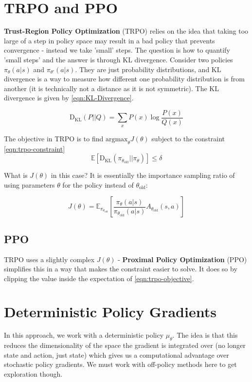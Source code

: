 \documentclass[11pt]{report}
\begin{document}
\section{TRPO and PPO}
\textbf{Trust-Region Policy Optimization} (TRPO) relies on the idea that taking too large of a step in policy space may result in a bad policy that prevents convergence - instead we take 'small' steps. The question is how to quantify 'small steps' and the answer is through KL divergence. Consider two policies $\pi_\theta(a | s)$ and $\pi_{\theta'}(a | s)$. They are just probability distributions, and KL divergence is a way to measure how different one probability distribution is from another (it is technically not a distance as it is not symmetric). The KL divergence is given by \autoref{eqn:KL-Divergence}.

\begin{equation}
	\label{eqn:KL-Divergence}
	\text{D}_{\text{KL}}(P|| Q) = \sum_{x} P(x) \log\frac{P(x)}{Q(x)}
\end{equation}

The objective in TRPO is to find $\text{argmax}_{\theta}J(\theta)$ subject to the constraint \autoref{eqn:trpo-constraint}
\begin{equation}
	\label{eqn:trpo-constraint}
	\mathbb{E}\left[ \text{D}_{\text{KL}}(\pi_{\theta_{\text{old}}} || \pi_{\theta}) \right] \le \delta
\end{equation}

What is $J(\theta)$ in this case? It is essentially the importance sampling ratio of using parameters $\theta$ for the policy instead of $\theta_{\text{old}}$:

\begin{equation}
	\label{eqn:trpo-objective}
	J(\theta) = \mathbb{E}_{\pi_{\theta_\text{old}}}\left[  \frac{\pi_{\theta}(a|s)}{\pi_{\theta_\text{old}}(a|s)} A_{\theta_{\text{old}}}(s, a) \right]
\end{equation}


\subsection{PPO}
TRPO uses a slightly complex $J(\theta)$ - \textbf{Proximal Policy Optimization} (PPO) simplifies this in a way that makes the constraint easier to solve. It does so by clipping the value inside the expectation of \autoref{eqn:trpo-objective}.


\section{Deterministic Policy Gradients}
In this approach, we work with a deterministic policy $\mu_\theta$. The idea is that this reduces the dimensionality of the space the gradient is integrated over (no longer state and action, just state) which gives us a computational advantage over stochastic policy gradients. We must work with off-policy methods here to get exploration though.
\end{document}
